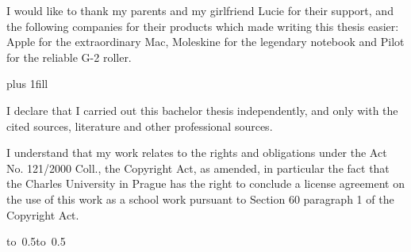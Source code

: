 \documentclass[12pt,a4paper]{report}
\let\openright=\clearpage
\begin{document}
\newpage



\openright

\noindent
I would like to thank my parents and my girlfriend Lucie for their support, and the following companies for their products which made writing this thesis easier: Apple for the extraordinary Mac, Moleskine for the legendary notebook and Pilot for the reliable G-2 roller.

\newpage


\vglue 0pt plus 1fill

\noindent
I declare that I carried out this bachelor thesis independently, and only
with the cited sources, literature and other professional sources.

\medskip\noindent
I understand that my work relates to the rights and obligations under
the Act No. 121/2000 Coll., the Copyright Act, as amended, in particular the fact
that the Charles University in Prague has the right to conclude a license agreement
on the use of this work as a school work pursuant to Section 60 paragraph 1 of the Copyright Act.

\vspace{10mm}

\hbox{\hbox to 0.5\hbox to 0.5}

\vspace{20mm}
\newpage

\end{document}
